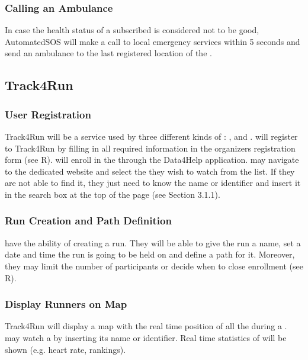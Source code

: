 \documentclass[../../rasd.tex]{subfiles}
\begin{document}
				\subsubsection{Calling an Ambulance} 
				In case the health status of a subscribed  is considered not to be good, AutomatedSOS will make a call to local emergency services within 5 seconds and send an ambulance to the last registered location of the .

			\subsection{Track4Run}
				
				\subsubsection{User Registration}
				Track4Run will be a service used by three different kinds of : ,  and . will register to Track4Run by filling in all required information in the organizers registration form (see R).  will enroll in the  through the Data4Help application.  may navigate to the  dedicated website and select the  they wish to watch from the list. If they are not able to find it, they just need to know the  name or identifier and insert it in the search box at the top of the page (see Section 3.1.1).
				
				\subsubsection{Run Creation and Path Definition}
				 have the ability of creating a run. They will be able to give the run a name, set a date and time the run is going to be held on and define a path for it. Moreover, they may limit the number of participants or decide when to close enrollment (see R).
				
				\subsubsection{Display Runners on Map}

				Track4Run will display a map with the real time position of all the  during a .  may watch a  by inserting its name or identifier. Real time statistics of  will be shown (e.g. heart rate, rankings). 
\end{document}

